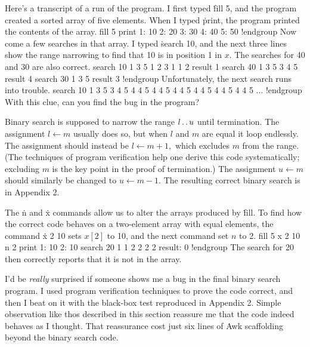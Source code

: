 Here's a transcript of a run of the program. I first typed \.{fill 5}, and the
program created a sorted array of five elements. When I typed \.{print}, the
program printed the contents of the array.
\begindisplay
\vbox{\begingroup
\verbatim
fill 5
print
1:      10
2:      20
3:      30
4:      40
5:      50
!endgroup
\endgroup}
\enddisplay
 Now come a few searches in that array. I typed \.{search 10}, and
the next three lines show the range narrowing to find that 10 is in position 1
in $x.$ The searches for 40 and 30 are also correct.
\begindisplay
\vbox{\begingroup
\verbatim
search  10
    1 3 5
    1 2 3
    1 1 2
result   1
search  40
    1 3 5
    3 4 5
result   4
search  30
    1 3 5
result   3
!endgroup
\endgroup}
\enddisplay
Unfortunately, the next search runs into trouble.
\begindisplay
\vbox{\begingroup
\verbatim
search  10
    1 3 5
    3 4 5
    4 4 5
    4 4 5
    4 4 5
    4 4 5
    4 4 5
    4 4 5
     ...
!endgroup
\endgroup}
\enddisplay
With this clue, can you find  the bug in the program?

Binary search is supposed to narrow the range $l\mathinner{\ldotp\ldotp} u$ until termination. The
assignment $l\leftarrow m$ usually does so, but when $l$ and $m$ are equal it
loop endlessly. The assignment should instead be $l\leftarrow m+1,$ which
excludes $m$ from the range. (The techniques of program verification help one
derive this code systematically; excluding $m$ is the key point in the proof of
termination.) The assignment $u\leftarrow m$ should similarly be changed to
$u\leftarrow m-1.$ The resulting correct binary search is in Appendix 2.

The \.{n} and \.{x} commands allow us to alter the arrays produced by
\.{fill}. To find how the correct code behaves on a two-element array with
equal elements, the command \.{x 2 10} sets $x[2]$ to 10, and the next
command set $n$ to 2.
\begindisplay
\vbox{\begingroup
\verbatim
fill 5
x 2 10
n 2
print
1:      10
2:      10
search 20
   1 1 2
   2 2 2
result: 0
!endgroup
\endgroup}
\enddisplay
The search for 20 then correctly reports that it is not in the array.

I'd be {\it really\/} surprised if someone shows me a bug in the final binary
search program. I used program verification techniques to prove the code
correct, and then I beat on it with the black-box test reproduced in Appendix 2.
Simple observation like thos described in this section reassure me that the code
indeed behaves as I thought. That reassurance cost just six lines of Awk
scaffolding beyond the binary search code.

